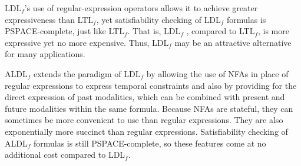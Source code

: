 \documentclass[10pt,a4paper]{amsart}
\theoremstyle{plain}
\theoremstyle{definition}
\theoremstyle{definition}
\DeclareMathOperator{\?}{?}
\begin{document}
LDL$_f$'s use of regular-expression operators allows it to achieve greater expressiveness than LTL$_f$, yet satisfiability checking of LDL$_f$ formulas is PSPACE-complete, just like LTL$_f$. That is,  LDL$_f$ , compared to LTL$_f$, is more expressive yet no more expensive. Thus, LDL$_f$ may be an attractive alternative for many applications.

ALDL$_f$ extends the paradigm of LDL$_f$ by allowing the use of NFAs in place of regular expressions to express temporal constraints and also by providing for the direct expression of past modalities, which can be combined with present and future modalities within the same formula. Because NFAs are stateful, they can sometimes be more convenient to use than regular expressions. They are also exponentially more succinct than regular expressions. Satisfiability checking of ALDL$_f$ formulas is still PSPACE-complete, so these features come at no additional cost compared to LDL$_f$.
\end{document}
